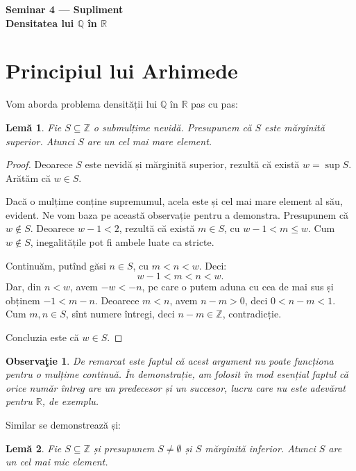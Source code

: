 \documentclass[11pt,a4paper]{article}
\newcommand\seq{\subseteq}
\newcommand\RR{\mathbb{R}}
\newcommand\ZZ{\mathbb{Z}}
\newcommand\QQ{\mathbb{Q}}
\theoremstyle{dotless}
\newtheorem{lemma}{Lem\u{a}}[section]
\theoremstyle{dotlessdr}
\newtheorem{remark}{Observa\c{t}ie}[section]
\begin{document}
\begin{center}
  {\large \textbf{Seminar 4 --- Supliment \\ Densitatea lui $\QQ$ în $\RR$}}
\end{center}

\vspace{2cm}

\section{Principiul lui Arhimede}
\label{sec:arhimede}

Vom aborda problema densității lui $\QQ$ în $\RR$ pas cu pas:

\begin{lemma}\label{le:z-nemarg}
  Fie $S \seq \ZZ$ o submulțime nevidă. Presupunem că $S$ este mărginită superior.
  Atunci $S$ are un cel mai mare element.
\end{lemma}

\begin{proof}
  Deoarece $S$ este nevidă și mărginită superior, rezultă că există $w = \sup S$.
  Arătăm că $w \in S$.

  Dacă o mulțime conține supremumul, acela este și cel mai mare element al său, evident. Ne vom
  baza pe această observație pentru a demonstra. Presupunem că $w \notin S$. Deoarece $w - 1 < 2$,
  rezultă că există $m \in S$, cu $w - 1 < m \leq w$. Cum $w \notin S$, inegalitățile pot fi ambele
  luate ca stricte.

  Continuăm, putînd găsi $n \in S$, cu $m < n < w$. Deci:
  \[
    w - 1 < m < n < w.
  \]
  Dar, din $n < w$, avem $-w < - n$, pe care o putem aduna cu cea de mai sus și
  obținem $-1 < m - n$. Deoarece $m < n$, avem $n - m > 0$, deci $0 < n - m < 1$.
  Cum $m, n \in S$, sînt numere întregi, deci $n - m \in \ZZ$, contradicție.

  Concluzia este că $w \in S$.
\end{proof}

\begin{remark}\label{rk:pentru-r}
  De remarcat este faptul că acest argument nu poate funcționa pentru o mulțime
  continuă. În demonstrație, am folosit în mod esențial faptul că orice număr
  întreg are un predecesor și un succesor, lucru care nu este adevărat pentru $\RR$,
  de exemplu.
\end{remark}

Similar se demonstrează și:

\begin{lemma}\label{le:min-elem-z}
  Fie $S \seq \ZZ$ și presupunem $S \neq \emptyset$ și $S$ mărginită inferior.
  Atunci $S$ are un cel mai mic element.
\end{lemma}
\end{document}
